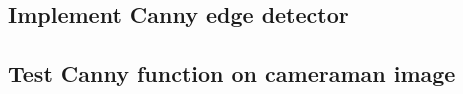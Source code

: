 \documentclass[abstract=true]{scrartcl}
\begin{document}
    \subsection{Implement Canny edge detector}

    \subsection{Test Canny function on cameraman image}


\end{document}
